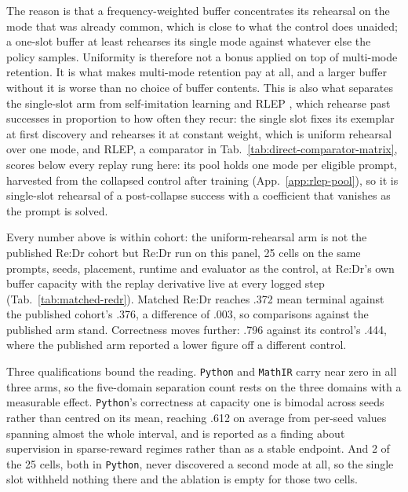 The reason is that a frequency-weighted buffer concentrates its rehearsal on
the mode that was already common, which is close to what the control does
unaided; a one-slot buffer at least rehearses its single mode against
whatever else the policy samples. Uniformity is therefore not a bonus applied
on top of multi-mode retention. It is what makes multi-mode retention pay at
all, and a larger buffer without it is worse than no choice of buffer
contents. This is also what separates the single-slot arm from self-imitation
learning \citep{oh2018self} and RLEP \citep{zhang2025rlep}, which rehearse
past successes in proportion to how often they recur: the single slot fixes
its exemplar at first discovery and rehearses it at constant weight, which is
uniform rehearsal over one mode, and RLEP, a comparator in
Tab.~\ref{tab:direct-comparator-matrix}, scores below every replay rung here:
its pool holds one mode per eligible prompt, harvested from the collapsed
control after training (App.~\ref{app:rlep-pool}), so it is single-slot
rehearsal of a post-collapse success with a coefficient that vanishes as the
prompt is solved.

Every number above is within cohort: the uniform-rehearsal arm is not the
published Re:Dr cohort but Re:Dr run on this panel,
25 cells on the same prompts, seeds, placement, runtime and evaluator
as the control, at Re:Dr's own buffer capacity with the replay derivative live
at every logged step (Tab.~\ref{tab:matched-redr}). Matched Re:Dr
reaches .372 mean terminal \pmd{} against the published cohort's
.376, a difference of .003, so \pmd{} comparisons against
the published arm stand. Correctness moves further: .796 against
its control's .444, where the published arm reported a lower figure
off a different control.

Three qualifications bound the reading. \texttt{Python} and \texttt{MathIR}
carry \pmd{} near zero in all three arms, so the five-domain separation count
rests on the three domains with a measurable effect. \texttt{Python}'s
correctness at capacity one is bimodal across seeds rather than centred on its
mean, reaching .612 on average from per-seed values spanning
almost the whole interval, and is reported as a finding about supervision in
sparse-reward regimes rather than as a stable endpoint. And 2 of
the 25 cells, both in \texttt{Python}, never discovered a second mode
at all, so the single slot withheld nothing there and the ablation is empty
for those two cells.

